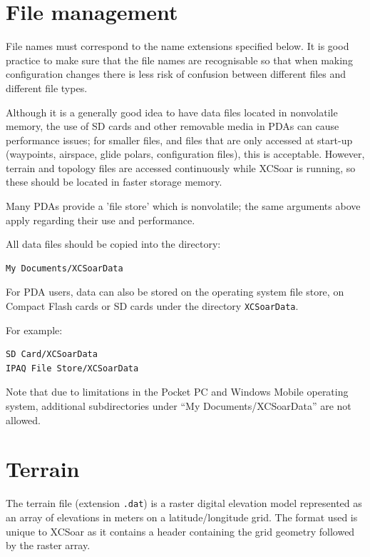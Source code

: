 \documentclass[a4paper,12pt]{refrep}
\begin{document}
\section{File management}

File names must correspond to the name extensions specified below.  It
is good practice to make sure that the file names are recognisable so
that when making configuration changes there is less risk of confusion
between different files and different file types.

Although it is a generally good idea to have data files located in
nonvolatile memory, the use of SD cards and other removable media in
PDAs can cause performance issues; for smaller files, and files that
are only accessed at start-up (waypoints, airspace, glide polars,
configuration files), this is acceptable.  However, terrain and
topology files are accessed continuously while XCSoar is running, so
these should be located in faster storage memory.

Many PDAs provide a 'file store' which is nonvolatile; the same
arguments above apply regarding their use and performance.

All data files should be copied into the directory:
\begin{verbatim}
My Documents/XCSoarData
\end{verbatim}

For PDA users, data can also be stored on the operating system file
store, on Compact Flash cards or SD cards under the directory
\verb|XCSoarData|.

For example:
\begin{verbatim}
SD Card/XCSoarData
IPAQ File Store/XCSoarData
\end{verbatim}


Note that due to limitations in the Pocket PC and Windows Mobile
operating system, additional subdirectories under ``My
Documents/XCSoarData'' are not allowed.

\section{Terrain}

The terrain file (extension \verb|.dat|) is a raster digital elevation
model represented as an array of elevations in meters on a
latitude/longitude grid.  The format used is unique to XCSoar as it
contains a header containing the grid geometry followed by the raster
array.
\end{document}
